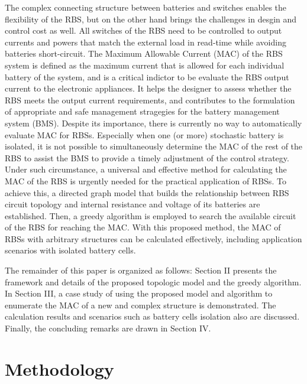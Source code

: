 \documentclass{article}
\begin{document}
The complex connecting structure between batteries and switches enables the flexibility of the RBS, but on the other hand brings the challenges in desgin and control cost as well.
All switches of the RBS need to be controlled to output currents and powers that match the external load in read-time while avoiding batteries short-circuit.
The Maximum Allowable Current (MAC) of the RBS system is defined as the maximum current that is allowed for each individual battery of the system, and is a critical indictor to be evaluate the RBS output current to the electronic appliances.%
It helps the designer to assess whether the RBS meets the output current requirements, and contributes to the formulation of appropriate and safe management stragegies for the battery management system (BMS). 
Despite its importance, there is currently no way to automatically evaluate MAC for RBSs. 
Especially when one (or more) stochastic battery is isolated, it is not possible to simultaneously determine the MAC of the rest of the RBS to assist the BMS to provide a timely adjustment of the control strategy. 
Under such circumstance, a universal and effective method for calculating the MAC of the RBS is urgently needed for the practical application of RBSs. 
To achieve this, a directed graph model that builds the relationship between RBS circuit topology and internal resistance and voltage of its batteries are established. 
Then, a greedy algorithm is employed to search the available circuit of the RBS for reaching the MAC.
With this proposed method, the MAC of RBSs with arbitrary structures can be calculated effectively, including application scenarios with isolated battery cells.


The remainder of this paper is organized as follows: 
Section II presents the framework and details of the proposed topologic model and the greedy algorithm. 
In Section III, a case study of using the proposed model and algorithm to enumerate the MAC of a new and complex structure is demonstrated. 
The calculation results and scenarios such as battery cells isolation also are discussed. 
Finally, the concluding remarks are drawn in Section IV.


\section{Methodology}
\end{document}

